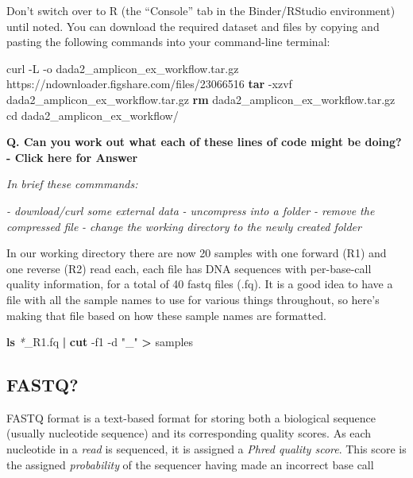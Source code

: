 \documentclass[
]{book}
\newenvironment{Shaded}{\begin{snugshade}}{\end{snugshade}}
\newcommand{\AttributeTok}[1]{\textcolor[rgb]{0.13,0.29,0.53}{#1}}
\newcommand{\BuiltInTok}[1]{#1}
\newcommand{\ExtensionTok}[1]{#1}
\newcommand{\FunctionTok}[1]{\textcolor[rgb]{0.13,0.29,0.53}{\textbf{#1}}}
\newcommand{\KeywordTok}[1]{\textcolor[rgb]{0.13,0.29,0.53}{\textbf{#1}}}
\newcommand{\NormalTok}[1]{#1}
\newcommand{\OperatorTok}[1]{\textcolor[rgb]{0.81,0.36,0.00}{\textbf{#1}}}
\newcommand{\PreprocessorTok}[1]{\textcolor[rgb]{0.56,0.35,0.01}{\textit{#1}}}
\newcommand{\StringTok}[1]{\textcolor[rgb]{0.31,0.60,0.02}{#1}}
\begin{document}
Don't switch over to R (the ``Console'' tab in the Binder/RStudio environment) until noted. You can download the required dataset and files by copying and pasting the following commands into your command-line terminal:

\begin{Shaded}
\begin{Highlighting}[]
    \ExtensionTok{curl} \AttributeTok{{-}L} \AttributeTok{{-}o}\NormalTok{ dada2\_amplicon\_ex\_workflow.tar.gz https://ndownloader.figshare.com/files/23066516}
    \FunctionTok{tar} \AttributeTok{{-}xzvf}\NormalTok{ dada2\_amplicon\_ex\_workflow.tar.gz}
    \FunctionTok{rm}\NormalTok{ dada2\_amplicon\_ex\_workflow.tar.gz}
    \BuiltInTok{cd}\NormalTok{ dada2\_amplicon\_ex\_workflow/}
\end{Highlighting}
\end{Shaded}

\textbf{Q. Can you work out what each of these lines of code might be doing? - Click here for Answer}

\emph{In brief these commmands:}

\emph{- download/curl some external data}
\emph{- uncompress into a folder}
\emph{- remove the compressed file}
\emph{- change the working directory to the newly created folder}

In our working directory there are now 20 samples with one forward (R1) and one reverse (R2) read each, each file has DNA sequences with per-base-call quality information, for a total of 40 fastq files (.fq). It is a good idea to have a file with all the sample names to use for various things throughout, so here's making that file based on how these sample names are formatted.

\begin{Shaded}
\begin{Highlighting}[]
    \FunctionTok{ls} \PreprocessorTok{*}\NormalTok{\_R1.fq }\KeywordTok{|} \FunctionTok{cut} \AttributeTok{{-}f1} \AttributeTok{{-}d} \StringTok{"\_"} \OperatorTok{\textgreater{}}\NormalTok{ samples}
\end{Highlighting}
\end{Shaded}

\hypertarget{fastq}{%
\subsection{FASTQ?}\label{fastq}}

FASTQ format is a text-based format for storing both a biological sequence (usually nucleotide sequence) and its corresponding quality scores. As each nucleotide in a \emph{read} is sequenced, it is assigned a \emph{Phred quality score}. This score is the assigned \emph{probability} of the sequencer having made an incorrect base call
\end{document}
